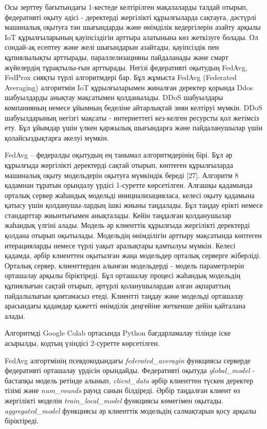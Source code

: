 \begin{multicols}{2}

Осы зерттеу бағытындағы 1-кестеде келтірілген мақалаларды талдай отырып,
федеративті оқыту әдісі - деректерді жергілікті құрылғыларда сақтауға,
дәстүрлі машиналық оқытуға тән шығындарды және өнімділік кедергілерін
азайту арқылы IoT құрылғыларының қауіпсіздігін арттыра алатынына көз
жеткізуге болады. Ол сондай-ақ есептеу және желі шығындарын азайтады,
қауіпсіздік пен құпиялылықты арттырады, параллелизацияны пайдаланады
және смарт жүйелердің тұрақтылы-ғын арттырады. Негізі федеративті
оқытудың FedAvg, FedProx сияқты түрлі алгоритмдері бар. Бұл жұмыста
FedAvg (Federated Averaging) алгоритмін IoT құрылғыларымен жиналған
деректер қорында Ddos шабуылдарды анықтау мақсатымен қолданылады. DDoS
шабуылдары компанияның немесе ұйымның беделіне айтарлықтай зиян келтіруі
мүмкін. DDoS шабуылдарының негізгі мақсаты - интернеттегі кез-келген
ресурсты қол жетімсіз ету. Бұл ұйымдар үшін үлкен қаржылық шығындарға
және пайдаланушылар үшін қолайсыздықтарға әкелуі мүмкін.

FedAvg -- федералды оқытудың ең танымал алгоритмдерінің бірі. Бұл әр
құрылғыда жергілікті деректерді сақтай отырып, көптеген құрылғыларда
машиналық оқыту модельдерін оқытуға мүмкіндік береді {[}27{]}. Алгоритм
8 қадамнан тұратын орындалу үрдісі 1-суретте көрсетілген. Алғашқы
қадамында орталық сервер жаһандық модельді инициализацияласа, келесі
оқыту қадамына қатысу үшін қолданушы-лардың ішкі жиыны таңдалады. Бұл
таңдау ерікті немесе стандарттар жиынтығымен анықталады. Кейін таңдалған
қолданушылар жаһандық үлгіні алады. Модель әр клиенттік құрылғыда
жергілікті деректерді қолдана отырып оқытылады. Модельдің өнімділігін
арттыру мақсатында көптеген итерацияларды немесе түрлі уақыт аралықтары
қамтылуы мүмкін. Келесі қадамда, әрбір клиенттен оқытылған жаңа
модельдер орталық серверге жіберліді. Орталық сервер, клиенттерден
алынған модельдерді - модель параметрлерін орташалау арқылы біріктіреді.
Бұл орташалау процесі жаһандық модельдің құпиялығын сақтай отырып,
әртүрлі қоланушылардан алған ақпараттың пайдалылығын қамтамасыз етеді.
Клиентті таңдау және модельді орташалау арасындағы қадамдар қажетті
өнімділік деңгейіне жеткенше дейін қайталана алады.

Алгоритмді Google Colab ортасында Python бағдарламалау тілінде іске асырылды, кодтың үзіндісі 2-суретте көрсетілген.

FedAvg алгортмінің псевдокодындағы \emph{federated\_averagin} функциясы
серверде федеративті орташалау үрдісін орындайды. Федеративті оқытуда
\emph{global\_model} - бастапқы модель ретінде алынып,
\emph{client\_data} әрбір клиенттен түскен деректер тізімі және
\emph{num\_rounds} раунд санын білдіреді. Әрбір таңдалған клиент өз
жергілікті моделін \emph{train\_local\_model} функциясы көмегімен
оқытады. \emph{aggregated\_model} функциясы әр клиенттік модельдің
салмақтарын қосу арқылы біріктіреді.
\end{multicols}

